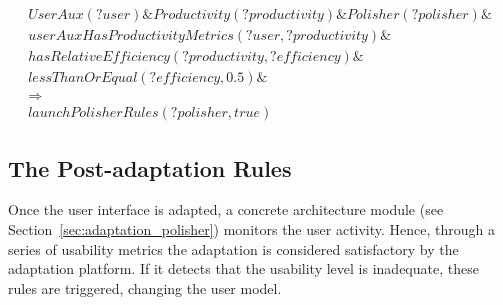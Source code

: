 \footnotesize
\begin{equation} \label{ec:usability_rule}
  \begin{align*} 
  UserAux(?user) \& Productivity(?productivity) \& Polisher(?polisher) \&\\ 
  userAuxHasProductivityMetrics(?user, ?productivity) \& \\
  hasRelativeEfficiency(?productivity, ?efficiency) \& \\
  lessThanOrEqual(?efficiency, 0.5) \& \\
  \Rightarrow \\
  launchPolisherRules(?polisher, true)
  \end{align*}
\end{equation}
\normalsize

\subsection{The Post-adaptation Rules}
Once the user interface is adapted, a concrete architecture module (see 
Section~\ref{sec:adaptation_polisher}) monitors the user activity. Hence, through
a series of usability metrics the adaptation is considered satisfactory by
the adaptation platform. If it detects that the usability level is inadequate,
these rules are triggered, changing the user model.


